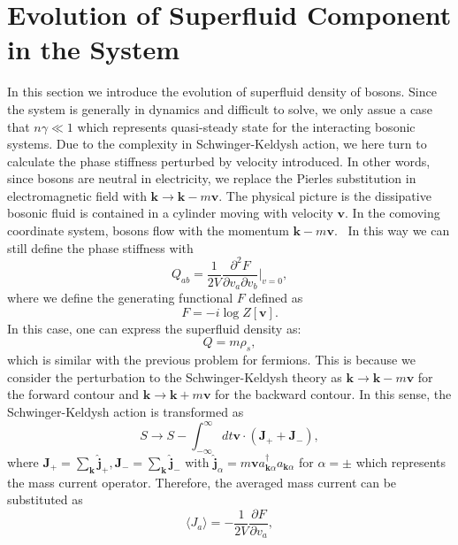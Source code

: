 \documentclass[aps,onecolumn,superscriptaddress,notitlepage,longbibliography]{revtex4-1}
\begin{document}
\section{Evolution of Superfluid Component in the System}

In this section we introduce the evolution of superfluid density of bosons.
Since the system is generally in dynamics and difficult to solve, we only
assue a case that $n \gamma \ll 1$ which represents quasi-steady state for the
interacting bosonic systems. Due to the complexity in Schwinger-Keldysh
action, we here turn to calculate the phase stiffness perturbed by velocity
introduced. In other words, since bosons are neutral in electricity, we
replace the Pierles substitution in electromagnetic field with $\mathbf{k}
\rightarrow \mathbf{k}- m\mathbf{v}$. The physical picture is the
dissipative bosonic fluid is contained in a cylinder moving with velocity
$\mathbf{v}$. In the comoving coordinate system, bosons flow with the
momentum $\mathbf{k}- m\mathbf{v}$. \ In this way we can still define the
phase stiffness with
\begin{equation}
  Q_{a b} = \frac{1}{2 V} \frac{\partial^2 F}{\partial v_a \partial v_b} |_{v
  = 0}, \label{Qv}
\end{equation}
where we define the generating functional $F$ defined as
\begin{equation}
  F=-i\log Z[\mathbf{v}].
\end{equation}
In this case, one can express the superfluid density as:
\begin{equation}
  Q = m \rho_s,
\end{equation}
which is similar with the previous problem for fermions. This is because we
consider the perturbation to the Schwinger-Keldysh theory as $\mathbf{k}
\rightarrow \mathbf{k}- m\mathbf{v}$ for the forward contour and
$\mathbf{k} \rightarrow \mathbf{k}+ m\mathbf{v}$ for the backward
contour. In this sense, the Schwinger-Keldysh action is transformed as
\begin{equation}
  S \rightarrow S - \int_{-\infty}^{\infty} dt\mathbf{v} \cdot (\mathbf{J}_+ +\mathbf{J}_-),
\end{equation}
where $\mathbf{J}_+ = \sum_{\mathbf{k}} \hat{\mathbf{j}}_+,
\mathbf{J}_- = \sum_{\mathbf{k}} \hat{\mathbf{j}}_-$ with
$\hat{\mathbf{j}}_{\alpha} = m\mathbf{v}a_{\mathbf{k} \alpha}^{\dagger}
a_{\mathbf{k} \alpha}$ for $\alpha = \pm$ which represents the mass current
operator. Therefore, the averaged mass current can be substituted as
\begin{equation}
  \langle J_a \rangle = - \frac{1}{2 V} \frac{\partial F}{\partial v_a},
\end{equation}
\end{document}
